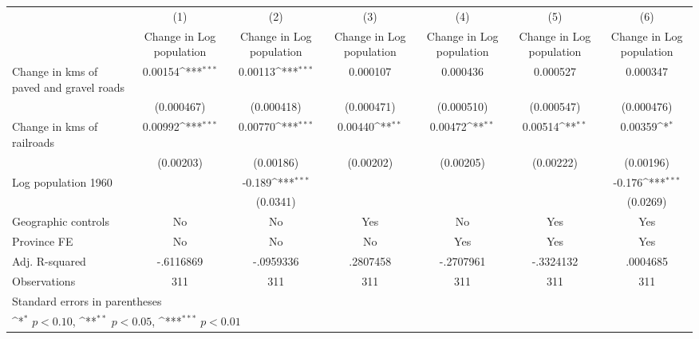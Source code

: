{
\def\sym#1{\ifmmode^{#1}\else\(^{#1}\)\fi}
\begin{tabular}{l*{6}{c}}
\hline\hline
                    &\multicolumn{1}{c}{(1)}&\multicolumn{1}{c}{(2)}&\multicolumn{1}{c}{(3)}&\multicolumn{1}{c}{(4)}&\multicolumn{1}{c}{(5)}&\multicolumn{1}{c}{(6)}\\
                    &\multicolumn{1}{c}{Change in Log population}&\multicolumn{1}{c}{Change in Log population}&\multicolumn{1}{c}{Change in Log population}&\multicolumn{1}{c}{Change in Log population}&\multicolumn{1}{c}{Change in Log population}&\multicolumn{1}{c}{Change in Log population}\\
\hline
Change in kms of paved and gravel roads&     0.00154\sym{***}&     0.00113\sym{***}&    0.000107         &    0.000436         &    0.000527         &    0.000347         \\
                    &  (0.000467)         &  (0.000418)         &  (0.000471)         &  (0.000510)         &  (0.000547)         &  (0.000476)         \\
[1em]
Change in kms of railroads&     0.00992\sym{***}&     0.00770\sym{***}&     0.00440\sym{**} &     0.00472\sym{**} &     0.00514\sym{**} &     0.00359\sym{*}  \\
                    &   (0.00203)         &   (0.00186)         &   (0.00202)         &   (0.00205)         &   (0.00222)         &   (0.00196)         \\
[1em]
Log population 1960 &                     &      -0.189\sym{***}&                     &                     &                     &      -0.176\sym{***}\\
                    &                     &    (0.0341)         &                     &                     &                     &    (0.0269)         \\
\hline
Geographic controls &          No         &          No         &         Yes         &          No         &         Yes         &         Yes         \\
Province FE         &          No         &          No         &          No         &         Yes         &         Yes         &         Yes         \\
Adj. R-squared      &   -.6116869         &   -.0959336         &    .2807458         &   -.2707961         &   -.3324132         &    .0004685         \\
Observations        &         311         &         311         &         311         &         311         &         311         &         311         \\
\hline\hline
\multicolumn{7}{l}{\footnotesize Standard errors in parentheses}\\
\multicolumn{7}{l}{\footnotesize \sym{*} \(p<0.10\), \sym{**} \(p<0.05\), \sym{***} \(p<0.01\)}\\
\end{tabular}
}
